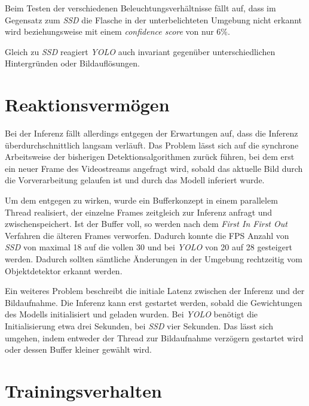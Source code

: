 Beim Testen der verschiedenen Beleuchtungsverhältnisse fällt auf, dass im Gegensatz zum \textit{SSD} die Flasche in der unterbelichteten Umgebung nicht erkannt wird beziehungsweise mit einem \textit{confidence score} von nur 6\%. 

Gleich zu \textit{SSD} reagiert \textit{YOLO} auch invariant gegenüber unterschiedlichen Hintergründen oder Bildauflösungen.
 
\section{Reaktionsvermögen}

Bei der Inferenz fällt allerdings entgegen der Erwartungen auf, dass die Inferenz überdurchschnittlich langsam verläuft. Das Problem lässt sich auf die synchrone Arbeitsweise der bisherigen Detektionsalgorithmen zurück führen, bei dem erst ein neuer Frame des Videostreams angefragt wird, sobald das aktuelle Bild durch die Vorverarbeitung gelaufen ist und durch das Modell inferiert wurde. 

Um dem entgegen zu wirken, wurde ein Bufferkonzept in einem parallelem Thread realisiert, der einzelne Frames zeitgleich zur Inferenz anfragt und zwischenspeichert. Ist der Buffer voll, so werden nach dem \textit{First In First Out} Verfahren die älteren Frames verworfen. Dadurch konnte die FPS Anzahl von \textit{SSD} von maximal 18 auf die vollen 30 und bei \textit{YOLO} von 20 auf 28 gesteigert werden. Dadurch sollten sämtliche Änderungen in der Umgebung rechtzeitig vom Objektdetektor erkannt werden. 

Ein weiteres Problem beschreibt die initiale Latenz zwischen der Inferenz und der Bildaufnahme. Die Inferenz kann erst gestartet werden, sobald die Gewichtungen des Modells initialisiert und geladen wurden. Bei \textit{YOLO} benötigt die Initialisierung etwa drei Sekunden, bei \textit{SSD} vier Sekunden. Das lässt sich umgehen, indem entweder der Thread zur Bildaufnahme verzögern gestartet wird oder dessen Buffer kleiner gewählt wird.

\section{Trainingsverhalten}


